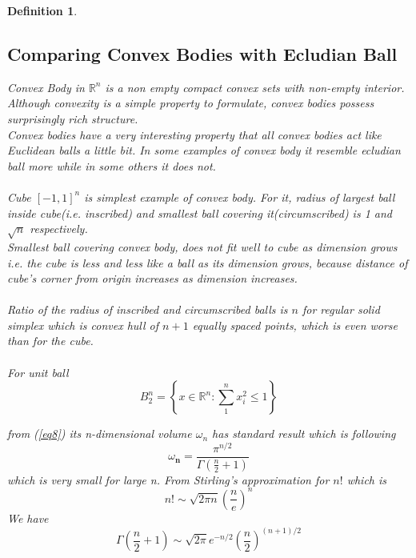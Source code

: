 \documentclass[oneside]{book}
\newtheorem{mydef}{Definition}
\begin{document}
\begin{mydef}
\subsection{Comparing Convex Bodies with Ecludian Ball}\label{ss:20}
Convex Body  in  $\mathbb{R}^n$  is a non empty compact convex sets with non-empty interior.\\
Although convexity is a simple property to formulate, convex bodies possess  surprisingly rich structure.\\
 Convex bodies have a very interesting property that all convex bodies act like Euclidean balls a little bit. In some examples of convex body it resemble ecludian ball more while in some others it does not.\\\\
Cube $[-1,1]^{n}$ is simplest example of convex body. For it, radius of largest ball inside cube(i.e. inscribed) and smallest ball covering it(circumscribed) is 1 and $\sqrt{n} $ respectively.
\\
 Smallest  ball covering convex body, does not fit well to cube as dimension grows i.e. the cube is less and less like a ball as its dimension grows, because distance of cube's corner from origin increases as dimension increases.\\\\
Ratio of the radius of inscribed and circumscribed balls is $ n $ for regular solid simplex which is convex hull of $ n + 1$  equally spaced points,  which is even worse than for the cube.
\\\\



For unit ball $$B_{2}^{n}=\left\{x \in \mathbb{R}^{n}: \sum_{1}^{n} x_{i}^{2} \leq 1\right\}$$

 from (\ref{eq8})
its n-dimensional volume  $\omega_{{n}}$ has standard result which is following
\\
$$\omega_{\mathbf{n} }  =\frac{\pi^{n / 2}}{\Gamma\left(\frac{n}{2}+1\right)} $$
which is very small for large n. From Stirling's approximation for $ n!$
which is 
$$n ! \sim \sqrt{2 \pi n}\left(\frac{n}{e}\right)^{n}$$
We have 
$$\Gamma\left(\frac{n}{2}+1\right) \sim \sqrt{2 \pi} e^{-n / 2}\left(\frac{n}{2}\right)^{(n+1) / 2}$$


\end{mydef}
\end{document}
